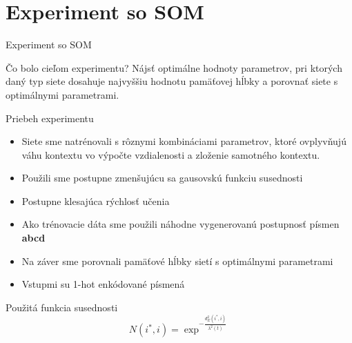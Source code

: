 \documentclass[10pt]{beamer}
\begin{document}
\section{Experiment so SOM}
\begin{frame}[fragile]{Experiment so SOM}

  \begin{block}{Čo bolo cieľom experimentu?}
    Nájsť optimálne hodnoty parametrov, pri ktorých daný typ siete dosahuje
    najvyššiu hodnotu pamäťovej hĺbky a porovnať siete s optimálnymi parametrami.
  \end{block}

\end{frame}



\begin{frame}[fragile]{Priebeh experimentu}

  \begin{itemize}
    \item Siete sme natrénovali s rôznymi kombináciami parametrov, ktoré ovplyvňujú váhu kontextu vo výpočte vzdialenosti a zloženie samotného kontextu.
    \item Použili sme postupne zmenšujúcu sa gausovskú funkciu susednosti
    \item Postupne klesajúca rýchlosť učenia
    \item Ako trénovacie dáta sme použili náhodne vygenerovanú postupnosť písmen \textbf{abcd}
    \item Na záver sme porovnali pamäťové hĺbky sietí s optimálnymi parametrami
    \item Vstupmi su 1-hot enkódované písmená
  \end{itemize} 

  Použitá funkcia susednosti
  \begin{equation}
		N(i^{*}, i) = \exp^{- \frac{d^{2}_{E}(i^{*}, i)}{\lambda^{2}(t)}}
	\end{equation}

\end{frame}
\end{document}
